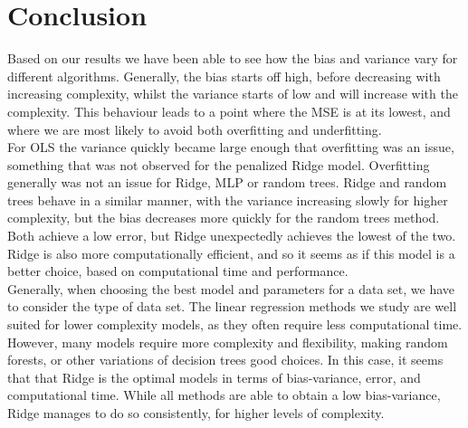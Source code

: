 \documentclass[reprint,english,notitlepage]{revtex4-1}  %
\begin{document}
\section{Conclusion}\label{sec: conclusion}
Based on our results we have been able to see how the bias and variance vary for different algorithms. Generally, the bias starts off high, before decreasing with increasing complexity, whilst the variance starts of low and will increase with the complexity. This behaviour leads to a point where the MSE is at its lowest, and where we are most likely to avoid both overfitting and underfitting. 
\vspace{3mm}
\\
For OLS the variance quickly became large enough that overfitting was an issue, something that was not observed for the penalized Ridge model. 
Overfitting generally was not an issue for Ridge, MLP or random trees. Ridge and random trees behave in a similar manner, with the variance increasing slowly for higher complexity, but the bias decreases more quickly for the random trees method. Both achieve a low error, but Ridge unexpectedly achieves the lowest of the two. Ridge is also more computationally efficient, and so it seems as if this model is a better choice, based on computational time and performance. 
\vspace{3mm}
\\ 
Generally, when choosing the best model and parameters for a data set, we have to consider the type of data set.
The linear regression methods we study are well suited for lower complexity models, as they often require less computational time. However, many models require more complexity and flexibility, making random forests, or other variations of decision trees good choices. 
In this case, it seems that that Ridge is the optimal models in terms of bias-variance, error, and computational time. While all methods are able to obtain a low bias-variance, Ridge manages to do so consistently, for higher levels of complexity. 


\end{document}
